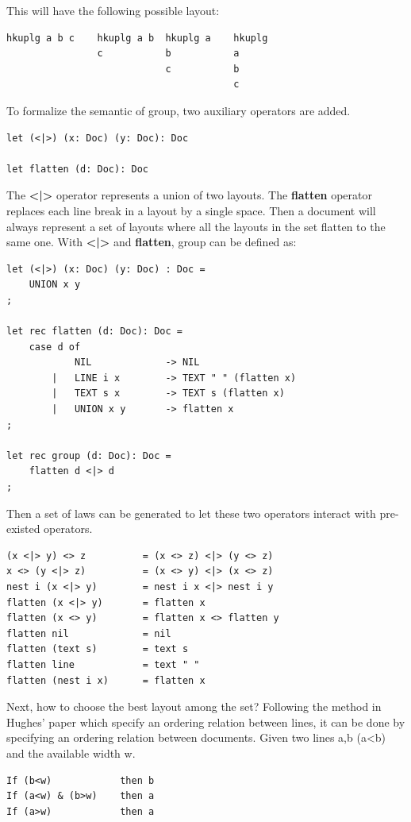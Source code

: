 This will have the following possible layout:
\begin{lstlisting}[language=Haskell]		
hkuplg a b c    hkuplg a b  hkuplg a    hkuplg
                c           b           a
                            c           b
                                        c
\end{lstlisting}

To formalize the semantic of group, two auxiliary operators are added.
\begin{lstlisting}
let (<|>) (x: Doc) (y: Doc): Doc

let flatten (d: Doc): Doc
\end{lstlisting}

The \textbf{<|>} operator represents a union of two layouts. The \textbf{flatten} operator replaces each line break in a layout by a single space. Then a document will always represent a set of layouts where all the layouts in the set flatten to the same one. With \textbf{<|>} and \textbf{flatten}, group can be defined as:
\begin{lstlisting}
let (<|>) (x: Doc) (y: Doc) : Doc =
    UNION x y
;

let rec flatten (d: Doc): Doc =
    case d of
            NIL             -> NIL
        |   LINE i x        -> TEXT " " (flatten x)
        |   TEXT s x        -> TEXT s (flatten x)
        |   UNION x y       -> flatten x
;

let rec group (d: Doc): Doc =
    flatten d <|> d
;
\end{lstlisting}

Then a set of laws can be generated to let these two operators interact with pre-existed operators.
\begin{lstlisting}
(x <|> y) <> z          = (x <> z) <|> (y <> z)
x <> (y <|> z)          = (x <> y) <|> (x <> z)
nest i (x <|> y)        = nest i x <|> nest i y
flatten (x <|> y)       = flatten x
flatten (x <> y)        = flatten x <> flatten y
flatten nil             = nil
flatten (text s)        = text s
flatten line            = text " "
flatten (nest i x)      = flatten x
\end{lstlisting}

Next, how to choose the best layout among the set? Following the method in Hughes' paper\cite{hughes1995design} which specify an ordering relation between lines, it can be done by specifying an ordering relation between documents. Given two lines a,b (a<b) and the available width w.
\begin{lstlisting}
If (b<w)            then b
If (a<w) & (b>w)    then a
If (a>w)            then a
\end{lstlisting}

